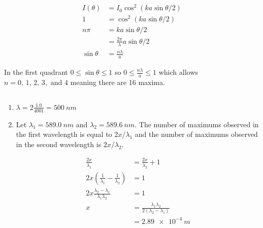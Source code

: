 \documentclass{article}
\begin{document}
\begin{align*}
  I(\theta)   & = I_0 \cos^2 (k a \sin \theta / 2)        \\
  1           & = \cos^2 (k a \sin \theta / 2)            \\
  n \pi       & = ka \sin \theta / 2                      \\
              & = \frac{2 \pi}{\lambda} a \sin \theta / 2 \\
  \sin \theta & = \frac{n \lambda}{a}
\end{align*}

In the first quadrant $0 \le \sin \theta \le 1$ so $0 \le \frac{n \lambda}{a} \le 1$ which allows $n = 0, \,1, \,2, \,3, \text{ and } 4$ meaning there are 16 maxima.

\subsection{}

\begin{enumerate}
  \item $\lambda = 2 \frac{1.0}{4001} = \qty{500}{nm}$

  \item Let $\lambda_1 = \qty{589.0}{nm}$ and $\lambda_2 = \qty{589.6}{nm}$. The number of maximums observed in the first wavelength is equal to $2 x / \lambda_1$ and the number of maximums observed in the second wavelength is $2 x / \lambda_2$.

        \begin{align*}
          \frac{2 x}{\lambda_1}                                        & = \frac{2 x}{\lambda_2} + 1                             \\
          2 x \left( \frac{1}{\lambda_1} - \frac{1}{\lambda_2} \right) & = 1                                                     \\
          2 x \frac{\lambda_2 - \lambda_1}{\lambda_1 \lambda_2}        & = 1                                                     \\
          x                                                            & = \frac{\lambda_1 \lambda_2}{2 (\lambda_2 - \lambda_1)} \\
                                                                       & = \qty{2.89e-4}{m}
        \end{align*}
\end{enumerate}

\subsection{}
\end{document}
